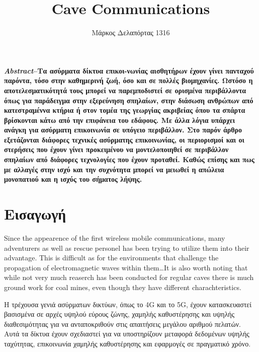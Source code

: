 \documentclass[12pt]{article}
\title{\textsf{Cave Communications}}
\author{\textsf{Μάρκος Δελαπόρτας 1316}}
\date{}
\begin{document}
\maketitle

\begin{multicols}{2}
    \scriptsize \textbf{
        \textit{Abstract}--Τα ασύρματα δίκτυα επικοι-νωνίας αισθητήρων έχουν γίνει
        πανταχού παρόντα, τόσο στην καθημερινή ζωή, όσο και σε πολλές βιομηχανίες. 
        Ωστόσο η αποτελεσματικότητά τους μπορεί να παρεμποδιστεί σε
        ορισμένα περιβάλλοντα όπως για παράδειγμα στην εξερεύνηση σπηλαίων, 
        στην διάσωση ανθρώπων από κατεστραμέννα κτήρια ή στον τομέα της γεωργίας ακριβείας 
        όπου τα σπάρτα βρίσκονται κάτω από την επιφάνεια του εδάφους. 
        Με άλλα λόγια υπάρχει ανάγκη για ασύρματη επικοινωνία σε υπόγειο περιβάλλον. 
        Στο παρόν άρθρο εξετάζονται διάφορες τεχνικές ασύρματης επικοινωνίας, 
        οι περιορισμοί και οι στερήσεις που έχουν γίνει προκειμένου να μοντελοποιηθεί σε περιβάλλον σπηλαίων από διάφορες τεχνολογίες που έχουν προταθεί. 
        Καθώς επίσης και πως με αλλαγές στην ισχύ και την συχνότητα μπορεί
        να μειωθεί η απώλεια
        μονοπατιού και η ισχύς του σήματος λήψης.
    }

    \section{\normalsize \textsf{Εισαγωγή}}
        Since the appearence of the first wireless mobile communications,
        many adventurers as well as rescue personel has been trying to 
        utilize them into their advantage. This is difficult as for the
        environments that challenge the propagation of electromagnetic 
        waves within them\dots It is also worth noting that while not 
        very much reaserch has been conducted for regular caves there 
        is much ground work for coal mines, even though they have 
        different charachteristics.

        Η τρέχουσα γενιά ασύρματων δικτύων, όπως το 4G και το 5G, 
        έχουν κατασκευαστεί βασισμένα σε αρχές υψηλού εύρους ζώνης, 
        χαμηλής καθυστέρησης και υψηλής διαθεσιμότητας για να ανταποκριθούν
        στις απαιτήσεις μεγάλου αριθμού πελατών. 
        Αυτά τα δίκτυα έχουν σχεδιαστεί για να υποστηρίζουν μεταφορά δεδομένων υψηλής ταχύτητας, 
        επικοινωνία χαμηλής καθυστέρησης και εφαρμογές σε πραγματικό χρόνο.
    

\end{multicols}
\end{document}
